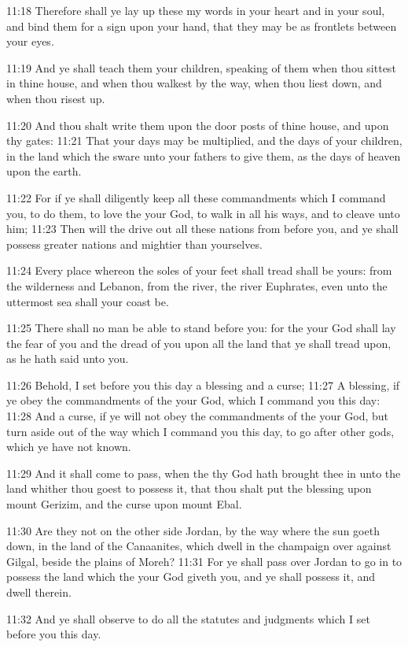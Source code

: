 11:18 Therefore shall ye lay up these my words in your heart and in
your soul, and bind them for a sign upon your hand, that they may be
as frontlets between your eyes.

11:19 And ye shall teach them your children, speaking of them when
thou sittest in thine house, and when thou walkest by the way, when
thou liest down, and when thou risest up.

11:20 And thou shalt write them upon the door posts of thine house,
and upon thy gates: 11:21 That your days may be multiplied, and the
days of your children, in the land which the \LORD sware unto your
fathers to give them, as the days of heaven upon the earth.

11:22 For if ye shall diligently keep all these commandments which I
command you, to do them, to love the \LORD your God, to walk in all his
ways, and to cleave unto him; 11:23 Then will the \LORD drive out all
these nations from before you, and ye shall possess greater nations
and mightier than yourselves.

11:24 Every place whereon the soles of your feet shall tread shall be
yours: from the wilderness and Lebanon, from the river, the river
Euphrates, even unto the uttermost sea shall your coast be.

11:25 There shall no man be able to stand before you: for the \LORD
your God shall lay the fear of you and the dread of you upon all the
land that ye shall tread upon, as he hath said unto you.

11:26 Behold, I set before you this day a blessing and a curse; 11:27
A blessing, if ye obey the commandments of the \LORD your God, which I
command you this day: 11:28 And a curse, if ye will not obey the
commandments of the \LORD your God, but turn aside out of the way which
I command you this day, to go after other gods, which ye have not
known.

11:29 And it shall come to pass, when the \LORD thy God hath brought
thee in unto the land whither thou goest to possess it, that thou
shalt put the blessing upon mount Gerizim, and the curse upon mount
Ebal.

11:30 Are they not on the other side Jordan, by the way where the sun
goeth down, in the land of the Canaanites, which dwell in the
champaign over against Gilgal, beside the plains of Moreh?  11:31 For
ye shall pass over Jordan to go in to possess the land which the \LORD
your God giveth you, and ye shall possess it, and dwell therein.

11:32 And ye shall observe to do all the statutes and judgments which
I set before you this day.

